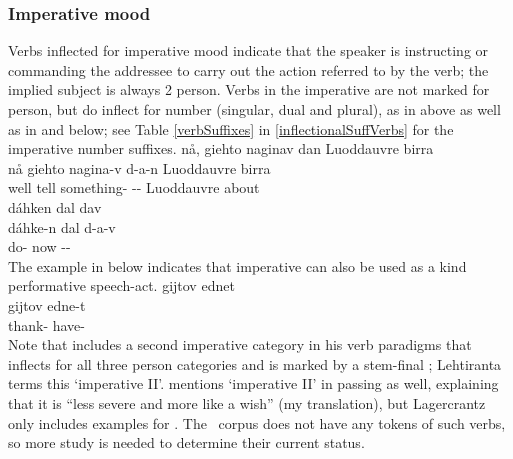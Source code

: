 \subsubsection{Imperative mood}\label{IMPmood}
Verbs inflected for imperative mood indicate that the speaker is instructing or commanding the addressee to carry out the action referred to by the verb; the implied subject is always 2 person. Verbs in the imperative are not marked for person, but do inflect for number (singular, dual and plural), as in  above as well as in  and  below; see Table \vref{verbSuffixes} in \SEC\ref{inflectionalSuffVerbs} for the imperative number suffixes. %
\ea\label{imperativeEx1}%
\glll	nå, giehto naginav dan Luoddauvre birra\\
	nå giehto nagina-v d-a-n Luoddauvre birra\\
	well tell\BS{} something- -- Luoddauvre\BS{} about\\\nopagebreak
{}	
\z
\ea\label{imperativeEx2}%
\glll	dáhken dal dav\\
	dáhke-n dal d-a-v\\
	do- now --\\\nopagebreak
{}	
\z
The example in  below indicates that imperative can also be used as a kind performative speech-act. 
\ea\label{imperativeEx3}%
\glll	gijtov ednet\\
	gijtov edne-t\\
	thank- have-\\\nopagebreak
{}	
\z
Note that \citet[150-155]{Lehtiranta1992} includes a second imperative category in his verb paradigms that inflects for all three person categories and is marked by a stem-final ; Lehtiranta terms this ‘imperative II’. \citet[22]{Lagercrantz1926} mentions ‘imperative II’ in passing as well, explaining that it is “less severe and more like a wish” (my translation), but  Lagercrantz only includes examples for \SGs. %
The \PSDP\ corpus does not have any tokens of such verbs, so more study is needed to determine their current status. 



